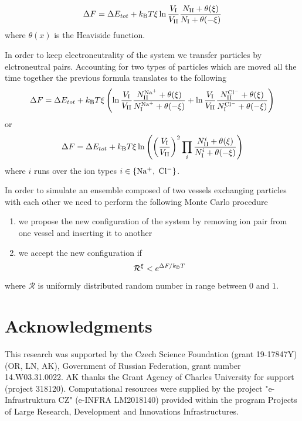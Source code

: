 \documentclass{elsarticle}
\begin{document}
\begin{equation}
\Delta F = \Delta E_{tot}+k_\mathrm{B}T\xi\ln\frac{V_{\mathrm{I}}}{V_{\mathrm{II}}}\frac{N_{\mathrm{II}}+\theta(\xi)}{N_{\mathrm{I}}+\theta(-\xi)}
\end{equation}
where $\theta(x)$ is the Heaviside function.

In order to keep electroneutrality of the system we transfer particles by elctroneutral pairs. 
Accounting for two types of particles which are moved all the time together the previous formula translates to the following
\begin{equation}
\Delta F = \Delta E_{tot}+k_\mathrm{B}T\xi\left(\ln\frac{V_{\mathrm{I}}}{V_{\mathrm{II}}}\frac{N^{\mathrm{Na^+}}_{\mathrm{II}}+\theta(\xi)}{N^{\mathrm{Na^+}}_{\mathrm{I}}+\theta(-\xi)}    + 
							    \ln\frac{V_{\mathrm{I}}}{V_{\mathrm{II}}}\frac{N^{\mathrm{Cl^-}}_{\mathrm{II}}+\theta(\xi)}{N^{\mathrm{Cl^-}}_{\mathrm{I}}+\theta(-\xi)}             \right)
\end{equation}
or
\begin{equation}
\Delta F = \Delta E_{tot}+k_\mathrm{B}T\xi\ln\left(\left(\frac{V_{\mathrm{I}}}{V_{\mathrm{II}}}\right)^2\prod_{i}\frac{N_{\mathrm{II}}^i+\theta(\xi)}{N_{\mathrm{I}}^i+\theta(-\xi)}\right) 
\end{equation}
where $i$ runs over the ion types $i\in\{\na,\ \cl\}$.

In order to simulate an ensemble composed of two vessels exchanging particles with each other we need to perform the following Monte Carlo procedure \cite{Frenlkel2002_book, SilvaFernandes2015a, Panagiotopoulos1988b}
\begin{enumerate}
	\item we propose the new configuration of the system by removing ion pair from one vessel and inserting it to another
	\item we accept the new configuration if
	\begin{equation}
        \mathcal{R}^{\xi}<e^{\Delta F/k_\mathrm{B}T}\label{eq: GC acceptance}
	\end{equation}
\end{enumerate}
where $\mathcal{R}$ is uniformly distributed random number in range between $0$ and $1$.


\section*{Acknowledgments}

This research was supported by the Czech Science Foundation (grant 19-17847Y) (OR, LN, AK),
Government of Russian Federation, grant number 14.W03.31.0022. %
AK thanks the Grant Agency of Charles University for support (project 318120).
Computational resources were supplied by the project "e-Infrastruktura CZ" (e-INFRA LM2018140) provided within the program Projects of Large Research, Development and Innovations Infrastructures.





\newpage
\pagebreak
\end{document}

